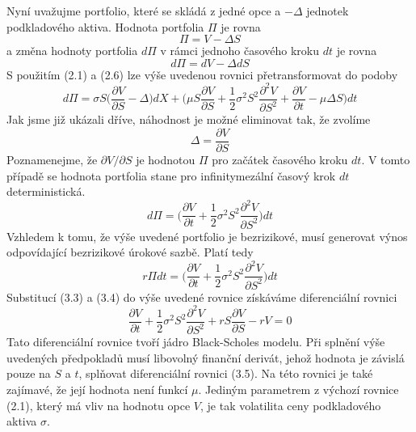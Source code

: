 \documentclass[a4paper]{book}
\begin{document}
Nyní uvažujme portfolio, které se skládá z jedné opce a $-\Delta$ jednotek podkladového aktiva. Hodnota portfolia $\Pi$ je rovna
\begin{equation}
\Pi = V -\Delta S
\end{equation}
a změna hodnoty portfolia $d \Pi$ v rámci jednoho časového kroku $dt$ je rovna
\begin{equation*}
d \Pi = dV -\Delta dS
\end{equation*}
S použitím (2.1) a (2.6) lze výše uvedenou rovnici přetransformovat do podoby
\begin{equation*}
d\Pi = \sigma S \Bigg( \frac{\partial V}{\partial S} - \Delta \Bigg)dX + \Bigg( \mu S \frac{\partial V}{\partial S} + \frac{1}{2}\sigma^2S^2\frac{\partial^2 V}{\partial S^2} + \frac{\partial V}{\partial t} - \mu \Delta S \Bigg)dt
\end{equation*}
Jak jsme již ukázali dříve, náhodnost je možné eliminovat tak, že zvolíme
\begin{equation}
\Delta = \frac{\partial V}{\partial S}
\end{equation}
Poznamenejme, že $\partial V/ \partial S$ je hodnotou $\Pi$ pro začátek časového kroku $dt$. V tomto případě se hodnota portfolia stane pro infinitymezální časový krok $dt$ deterministická.
\begin{equation*}
d \Pi = \Bigg( \frac{\partial V}{\partial t}  + \frac{1}{2}\sigma^2S^2\frac{\partial^2V}{\partial S^2}\Bigg)dt
\end{equation*}
Vzhledem k tomu, že výše uvedené portfolio je bezrizikové, musí generovat výnos odpovídající bezrizikové úrokové sazbě. Platí tedy
\begin{equation*}
r \Pi dt  = \Bigg( \frac{\partial V}{\partial t}  + \frac{1}{2}\sigma^2S^2\frac{\partial^2V}{\partial S^2}\Bigg)dt
\end{equation*}
Substitucí (3.3) a (3.4) do výše uvedené rovnice získáváme diferenciální rovnici
\begin{equation}
\frac{\partial V}{\partial t} + \frac{1}{2}\sigma^2 S^2 \frac{\partial^2 V}{\partial S^2} + rS \frac{\partial V}{\partial S} - rV = 0
\end{equation}
Tato diferenciální rovnice tvoří jádro Black-Scholes modelu. Při splnění výše uvedených předpokladů musí libovolný finanční derivát, jehož hodnota je závislá pouze na $S$ a $t$, splňovat diferenciální rovnici (3.5). Na této rovnici je také zajímavé, že její hodnota není funkcí $\mu$. Jediným parametrem z výchozí rovnice (2.1), který má vliv na hodnotu opce $V$, je tak volatilita ceny podkladového aktiva $\sigma$.
\end{document}
